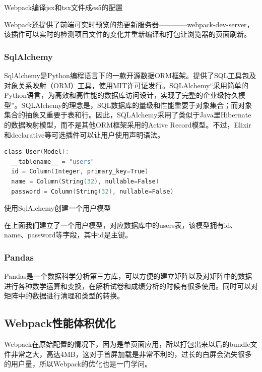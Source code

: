 \begin{center}
	{\small Webpack编译jsx和tsx文件成es5的配置}
\end{center}

Webpack还提供了前端可实时预览的热更新服务器————webpack-dev-server，该插件可以实时的检测项目文件的变化并重新编译和打包让浏览器的页面刷新。

\subsubsection{SqlAlchemy}
SqlAlchemy是Python编程语言下的一款开源数据ORM框架。提供了SQL工具包及对象关系映射（ORM）工具，使用MIT许可证发行。SQLAlchemy“采用简单的Python语言，为高效和高性能的数据库访问设计，实现了完整的企业级持久模型”。SQLAlchemy的理念是，SQL数据库的量级和性能重要于对象集合；而对象集合的抽象又重要于表和行。因此，SQLAlchemy采用了类似于Java里Hibernate的数据映射模型，而不是其他ORM框架采用的Active Record模型。不过，Elixir和declarative等可选插件可以让用户使用声明语法。

\begin{lstlisting}[language=C]
class User(Model):
  __tablename__ = "users"
  id = Column(Integer, primary_key=True)
  name = Column(String(32), nullable=False)
  password = Column(String(32), nullable=False)
\end{lstlisting}

\begin{center}
	{\small 使用SqlAlchemy创建一个用户模型}
\end{center}

在上面我们建立了一个用户模型，对应数据库中的users表，该模型拥有id、name、password等字段，其中id是主键。

\subsubsection{Pandas}

Pandas是一个数据科学分析第三方库，可以方便的建立矩阵以及对矩阵中的数据进行各种数学运算和变换，在解析试卷和成绩分析的时候有很多使用。同时可以对矩阵中的数据进行清理和类型的转换。

\subsection{Webpack性能体积优化}

Webpack在原始配置的情况下，因为是单页面应用，所以打包出来以后的bundle文件非常之大，高达4MB，这对于首屏加载是非常不利的，过长的白屏会流失很多的用户量，所以Webpack的优化也是一门学问。

